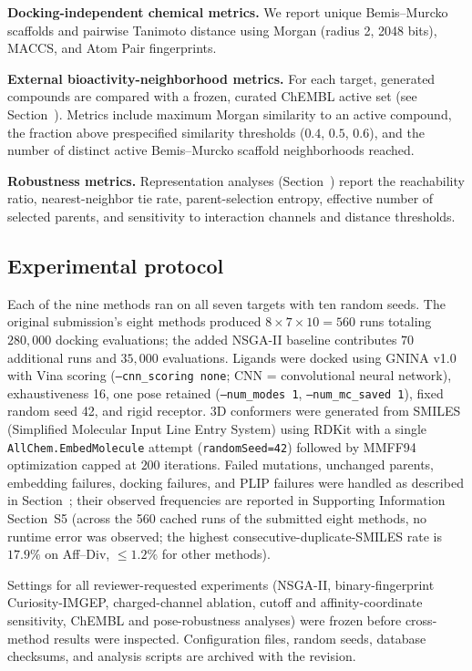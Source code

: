 \documentclass[journal=jcisd8,manuscript=article]{achemso}
\begin{document}
\textbf{Docking-independent chemical metrics.} We report unique Bemis--Murcko scaffolds\cite{bemis1996properties} and pairwise Tanimoto distance using Morgan (radius 2, 2048 bits), MACCS, and Atom Pair fingerprints.\cite{rdkit}

\textbf{External bioactivity-neighborhood metrics.} For each target, generated compounds are compared with a frozen, curated ChEMBL\cite{zdrazil2024chembl} active set (see Section~). Metrics include maximum Morgan similarity to an active compound, the fraction above prespecified similarity thresholds ($0.4$, $0.5$, $0.6$), and the number of distinct active Bemis--Murcko scaffold neighborhoods reached.

\textbf{Robustness metrics.} Representation analyses (Section~) report the reachability ratio, nearest-neighbor tie rate, parent-selection entropy, effective number of selected parents, and sensitivity to interaction channels and distance thresholds.

\subsection{Experimental protocol}
\label{sec:protocol}

Each of the nine methods ran on all seven targets with ten random seeds. The original submission's eight methods produced $8 \times 7 \times 10 = 560$ runs totaling $280{,}000$ docking evaluations; the added NSGA-II baseline contributes $70$ additional runs and $35{,}000$ evaluations. Ligands were docked using GNINA v1.0\cite{mcnutt2021gnina} with Vina scoring (\texttt{--cnn\_scoring none}; CNN = convolutional neural network), exhaustiveness 16, one pose retained (\texttt{--num\_modes 1}, \texttt{--num\_mc\_saved 1}), fixed random seed 42, and rigid receptor. 3D conformers were generated from SMILES (Simplified Molecular Input Line Entry System) using RDKit\cite{rdkit} with a single \texttt{AllChem.EmbedMolecule} attempt (\texttt{randomSeed=42}) followed by MMFF94 optimization capped at $200$ iterations. Failed mutations, unchanged parents, embedding failures, docking failures, and PLIP failures were handled as described in Section~; their observed frequencies are reported in Supporting Information Section~S5 (across the 560 cached runs of the submitted eight methods, no runtime error was observed; the highest consecutive-duplicate-SMILES rate is $17.9\%$ on Aff--Div, $\leq 1.2\%$ for other methods).

Settings for all reviewer-requested experiments (NSGA-II, binary-fingerprint Curiosity-IMGEP, charged-channel ablation, cutoff and affinity-coordinate sensitivity, ChEMBL and pose-robustness analyses) were frozen before cross-method results were inspected. Configuration files, random seeds, database checksums, and analysis scripts are archived with the revision.
\end{document}
